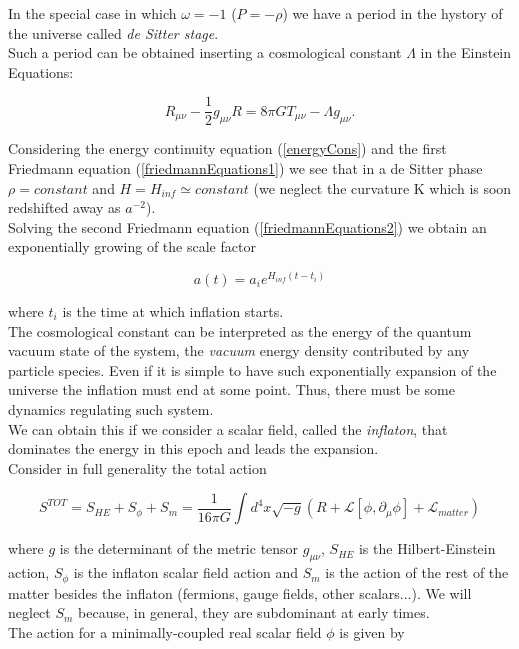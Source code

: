 \documentclass[11pt,a4paper,twoside]{book}
\begin{document}
In the special case in which $ \omega = -1 $ ($P=-\rho$) we have a period in the hystory of the universe called \textit{de Sitter stage}. \\
Such a period can be obtained inserting a cosmological constant $ \Lambda $ in the Einstein Equations: 

\begin{equation}
	\label{RGModified}
	R_{\mu\nu} - \frac{1}{2}g_{\mu\nu}R = 8\pi G T_{\mu\nu} - \Lambda g_{\mu\nu}.
\end{equation}

Considering the energy continuity equation (\ref{energyCons}) and the first Friedmann equation (\ref{friedmannEquations1}) we see that in a de Sitter phase $ \rho = constant $ and $ H = H_{inf} \simeq constant $ (we neglect the curvature K which is soon redshifted away as $ a^{-2} $).\\
Solving the second Friedmann equation (\ref{friedmannEquations2}) we obtain an exponentially growing of the scale factor

\begin{equation}
	\label{scaleFactorDeSitter}
	a(t)=a_{i} e^{ H_{inf}(t-t_{i})}	
\end{equation}

where $t_{i}$ is the time at which inflation starts. \\
The cosmological constant can be interpreted as the energy of the quantum vacuum state of the system, the \textit{vacuum} energy density contributed by any particle species. Even if it is simple to have such exponentially expansion of the universe the inflation must end at some point. Thus, there must be some dynamics regulating such system.\\
We can obtain this if we consider a scalar field, called the \textit{inflaton}, that dominates the energy in this epoch and leads the expansion.\\

Consider in full generality the total action

\begin{equation}
	\label{totalAction}
	S^{TOT} = S_{HE} + S_{\phi} + S_{m} 
		        = \frac{1}{16\pi G} \int d^{4} x \sqrt{-g} (R + \mathcal{L} [\phi , \partial_{\mu} \phi ] + \mathcal{L}_{matter}) 	
\end{equation}

where $ g $ is the determinant of the metric tensor $ g_{\mu\nu} $, $ S_{HE} $ is the Hilbert-Einstein action, $ S_{\phi} $ is the inflaton scalar field action and $ S_{m} $ is the action of the rest of the matter besides the inflaton (fermions, gauge fields, other scalars...). We will neglect $ S_{m} $ because, in general, they are subdominant at early times. \\
The action for a minimally-coupled real scalar field $ \phi $ is given by
\end{document}
